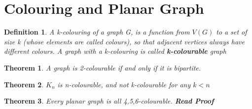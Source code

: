 \documentclass[10pt, a4paper]{article}
\newtheorem*{thm}{Theorem}
\newtheorem*{defn}{Definition}
\begin{document}
\section{Colouring and Planar Graph}
\begin{defn}
    A k-colouring of a graph G, is a function from $V(G)$ to a set of size k (whose elements are called colours), so that adjacent vertices always have different colours. A graph with a k-colouring is called \textbf{k-colourable} graph
\end{defn}
\begin{thm}
    A graph is 2-colourable if and only if it is bipartite.
\end{thm}
\begin{thm}
    $K_n$ is n-colourable, and not k-colourable for any $k < n$
\end{thm}
\begin{thm}
    Every planar graph is all 4,5,6-colourable. \textbf{Read Proof}
\end{thm}

\end{document}
